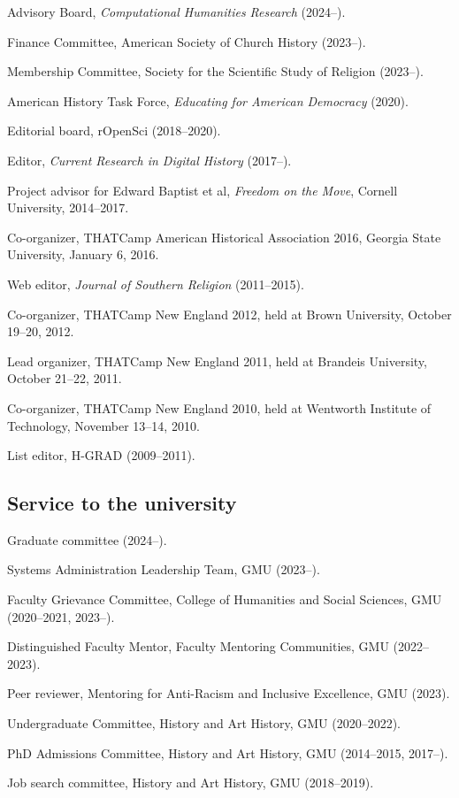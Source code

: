 \documentclass[11pt]{article}
\begin{document}
Advisory Board, \emph{Computational Humanities Research} (2024--).

Finance Committee, American Society of Church History (2023--).

Membership Committee, Society for the Scientific Study of Religion (2023--).

American History Task Force, \emph{Educating for American Democracy} (2020).

Editorial board, rOpenSci (2018--2020).

Editor, \emph{Current Research in Digital History} (2017--).

Project advisor for Edward Baptist et al, \emph{Freedom on the Move}, Cornell University, 2014--2017.

Co-organizer, THATCamp American Historical Association 2016, Georgia State University, January 6, 2016.

Web editor, \emph{Journal of Southern Religion} (2011--2015).

Co-organizer, THATCamp New England 2012, held at Brown University, October 19--20, 2012.

Lead organizer, THATCamp New England 2011, held at Brandeis University, October 21--22, 2011.

Co-organizer, THATCamp New England 2010, held at Wentworth Institute of Technology, November 13--14, 2010.

List editor, H-GRAD (2009--2011).

\subsection{Service to the university}\label{Service to the university}

Graduate committee (2024--).

Systems Administration Leadership Team, GMU (2023--).

Faculty Grievance Committee, College of Humanities and Social Sciences, GMU 
(2020--2021, 2023--).

Distinguished Faculty Mentor, Faculty Mentoring Communities, GMU (2022--2023).

Peer reviewer, Mentoring for Anti-Racism and Inclusive Excellence, GMU (2023).

Undergraduate Committee, History and Art History, GMU (2020--2022).

PhD Admissions Committee, History and Art History, GMU (2014--2015, 2017--).

Job search committee, History and Art History, GMU (2018--2019).
\end{document}
